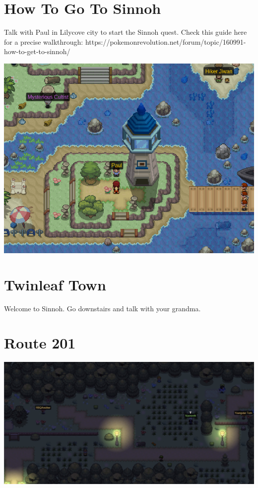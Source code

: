 \documentclass[11pt]{article}
\begin{document}
\pagecolor{LightColor}

\section{How To Go To Sinnoh}\label{sec:how-to-go-to-sinnoh}
Talk with Paul in Lilycove city to start the Sinnoh quest.
Check this guide here for a precise walkthrough:
https://pokemonrevolution.net/forum/topic/160991-how-to-get-to-sinnoh/

\includegraphics[width=\textwidth]{walkthrough/Sinnoh/paul-lilycove}

\section{Twinleaf Town}\label{sec:twinleaf-town}
Welcome to Sinnoh.
Go downstairs and talk with your grandma.

\section{Route 201}\label{sec:Route_201}
\includegraphics[width=\textwidth]{walkthrough/Sinnoh/Route_201}
\end{document}
